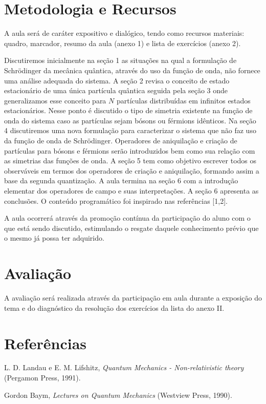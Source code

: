\documentclass{article}
\begin{document}
\section{Metodologia e Recursos}

A aula será de caráter expositivo e dialógico, tendo como recursos materiais: quadro, marcador, resumo da aula (anexo 1) e lista de exercícios (anexo 2).


Discutiremos inicialmente na seção 1 as situações na qual a formulação de Schrödinger da mecânica quântica, através do uso da função de onda, não fornece uma análise adequada do sistema. A seção 2 revisa o conceito de estado estacionário de uma única partícula quântica seguida pela seção 3 onde generalizamos esse conceito para $N$ partículas distribuídas em infinitos estados estacionários. Nesse ponto é discutido o tipo de simetria existente na função de onda do sistema caso as partículas sejam bósons ou férmions idênticos. Na seção 4 discutiremos uma nova formulação para caracterizar o sistema que não faz uso da função de onda de Schrödinger. Operadores de aniquilação e criação de partículas para bósons e férmions serão introduzidos bem como sua relação com as simetrias das funções de onda. A seção 5 tem como objetivo escrever todos os observáveis em termos dos operadores de criação e aniquilação, formando assim a base da segunda quantização. A aula termina na seção 6 com a introdução elementar dos operadores de campo e suas interpretações. A seção 6 apresenta as conclusões. O conteúdo programático foi inspirado nas referências [1,2].

A aula ocorrerá através da promoção contínua da participação do aluno com o que está sendo discutido, estimulando o resgate daquele conhecimento prévio que o mesmo já possa ter adquirido.

\section{Avaliação}

A avaliação será realizada através da participação em aula durante a exposição do tema e do diagnóstico da resolução dos exercícios da lista do anexo II. 

\section{Referências}

\noindent [1] L. D. Landau e E. M. Lifshitz, \textit{Quantum Mechanics - Non-relativistic theory} (Pergamon Press, 1991).

\noindent [2] Gordon Baym, \textit{Lectures on Quantum Mechanics} (Westview Press, 1990).
\end{document}
